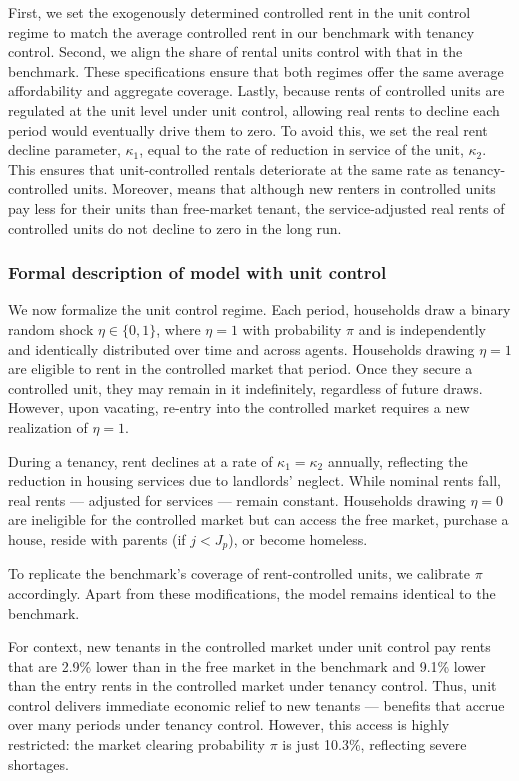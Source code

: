 \documentclass[parskip=full]{article}
\begin{document}
First, we set the exogenously determined controlled rent in the unit control regime to match the average controlled rent in our benchmark with tenancy control. Second, we align the share of rental units control with that in the benchmark. These specifications ensure that both regimes offer the same average affordability and aggregate coverage. Lastly, because rents of controlled units are regulated at the unit level under unit control, allowing real rents to decline each period would eventually drive them to zero. To avoid this, we set the real rent decline parameter, $\kappa_1$, equal to the rate of reduction in service of the unit, $\kappa_2$. This ensures that unit-controlled rentals deteriorate at the same rate as tenancy-controlled units. Moreover, means that although new renters in controlled units pay less for their units than free-market tenant, the service-adjusted real rents of controlled units do not decline to zero in the long run.

\subsubsection{Formal description of model with unit control}

We now formalize the unit control regime. Each period, households draw a binary random shock $\eta \in \{0,1\}$, where $\eta = 1$ with probability $\pi$ and is independently and identically distributed over time and across agents. Households drawing $\eta = 1$ are eligible to rent in the controlled market that period. Once they secure a controlled unit, they may remain in it indefinitely, regardless of future draws. However, upon vacating, re-entry into the controlled market requires a new realization of $\eta = 1$.

During a tenancy, rent declines at a rate of $\kappa_1 = \kappa_2$ annually, reflecting the reduction in housing services due to landlords' neglect. While nominal rents fall, real rents — adjusted for services — remain constant. Households drawing $\eta = 0$ are ineligible for the controlled market but can access the free market, purchase a house, reside with parents (if $j < J_p$), or become homeless.

To replicate the benchmark’s coverage of rent-controlled units, we calibrate $\pi$ accordingly. Apart from these modifications, the model remains identical to the benchmark.

For context, new tenants in the controlled market under unit control pay rents that are 2.9\% lower than in the free market in the benchmark and 9.1\% lower than the entry rents in the controlled market under tenancy control. Thus, unit control delivers immediate economic relief to new tenants — benefits that accrue over many periods under tenancy control. However, this access is highly restricted: the market clearing probability $\pi$ is just 10.3\%, reflecting severe shortages.
\end{document}

